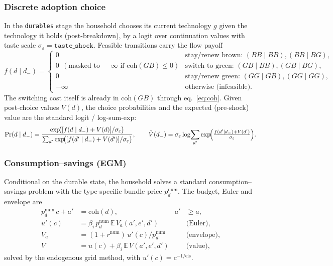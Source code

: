 \documentclass[11pt,a4paper]{article}
\newcommand{\E}{\mathbb{E}}
\newcommand{\num}{\mathrm{num}}
\newcommand{\coh}{\mathrm{coh}}
\begin{document}
\subsubsection{Discrete adoption choice}\label{sec:logit}

In the \texttt{durables} stage the household chooses its current technology $g$
given the technology it holds (post-breakdown), by a logit over continuation
values with taste scale $\sigma_\varepsilon=\texttt{taste\_shock}$. Feasible
transitions carry the flow payoff
\begin{equation}
f(d\mid d_-)=
\begin{cases}
0 & \text{stay/renew brown: } (BB\mid BB),(BB\mid BG),\\
0\ \ (\text{masked to }-\infty\text{ if }\coh(GB)\le 0)
& \text{switch to green: } (GB\mid BB),(GB\mid BG),\\
0 & \text{stay/renew green: } (GG\mid GB),(GG\mid GG),\\
-\infty & \text{otherwise (infeasible).}
\end{cases}
\end{equation}
The switching cost itself is already in $\coh(GB)$ through
eq.~\eqref{eq:coh}. Given post-choice values $V(d)$, the choice probabilities and the expected (pre-shock) value are
the standard logit / log-sum-exp:
\begin{equation}
\Pr(d\mid d_-)=\frac{\exp\!\bigl([f(d\mid d_-)+V(d)]/\sigma_\varepsilon\bigr)}
{\sum_{d'}\exp\!\bigl([f(d'\mid d_-)+V(d')]/\sigma_\varepsilon\bigr)},
\qquad
\tilde V(d_-)=\sigma_\varepsilon\log\!\sum_{d'}\exp\!\Bigl(\tfrac{f(d'\mid d_-)+V(d')}{\sigma_\varepsilon}\Bigr).
\end{equation}

\subsubsection{Consumption--savings (EGM)}

Conditional on the durable state, the household solves a standard
consumption--savings problem with the type-specific bundle price $p_d^{\num}$.
The budget, Euler and envelope are
\begin{align}
p_d^{\num}\,c + a' &= \coh(d), & a'&\ge \underline a, \label{eq:budget}\\
u'(c) &= \beta_i\,p_d^{\num}\,\E\,V_a(a',e',d') & &\text{(Euler)},\\
V_a &= (1+r^{\num})\,u'(c)/p_d^{\num} & &\text{(envelope)},\\
V &= u(c)+\beta_i\,\E\,V(a',e',d') & &\text{(value)},
\end{align}
solved by the endogenous grid method, with $u'(c)=c^{-1/\text{eis}}$.
\end{document}
